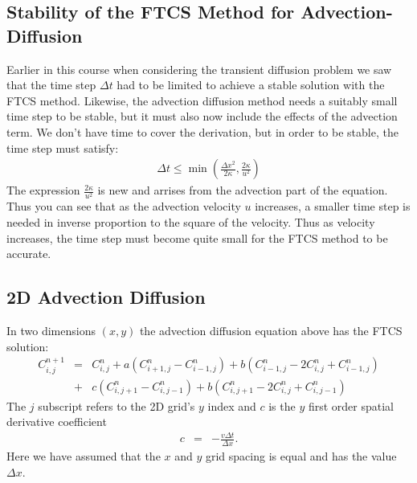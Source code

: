 \documentclass[11pt, oneside]{article}   	%
\begin{document}
\subsection*{Stability of the FTCS Method for Advection-Diffusion}
Earlier in this course when considering the transient diffusion problem we saw that the time step $\Delta t$ had to be limited to achieve a stable solution with the FTCS method.  Likewise, the advection diffusion method needs a suitably small time step to be stable, but it must also now include the effects of the advection term. We don't have time to cover the derivation, but in order to be stable, the time step must satisfy:
  \begin{eqnarray}
	\Delta t \le \min{ \left ( \frac{\Delta x^2}{2 \kappa} ,  \frac{2 \kappa}{u^2}  \right ) }
\end{eqnarray}
The expression $ \frac{2 \kappa}{u^2} $ is new and arrises from  the advection part of the equation. Thus you can see that as the advection velocity $u$ increases, a smaller time step is needed in inverse proportion to the square of the velocity. Thus as velocity increases, the time step must become quite small for the FTCS method to be accurate.


\subsection*{2D Advection Diffusion}
In two dimensions $(x,y)$ the advection diffusion equation above has the FTCS solution:
\begin{eqnarray}
	C^{n+1}_{i,j} &=& C^n_{i,j} + a \left ( {C^{n}_{i+1,j} - C^n_{i-1,j}}\right ) +  b 
\left ( {C^{n}_{i-1,j} - 2 C^n_{i,j}+C^n_{i-1,j}} \right )   \\
&+ & c \left ( {C^{n}_{i,j+1} - C^n_{i,j-1}}\right ) +  b
\left ( {C^{n}_{i,j+1} - 2 C^n_{i,j}+C^n_{i,j-1}} \right )
\end{eqnarray}
The $j$ subscript refers to the 2D grid's $y$ index and $c$ is the $y$ first order spatial derivative coefficient
\begin{eqnarray}
	c &=&  - \frac{ v \Delta t}{\Delta x} .
\end{eqnarray}
Here we have assumed that the $x$ and $y$ grid spacing is equal and has the value $\Delta x$. 
\end{document}
